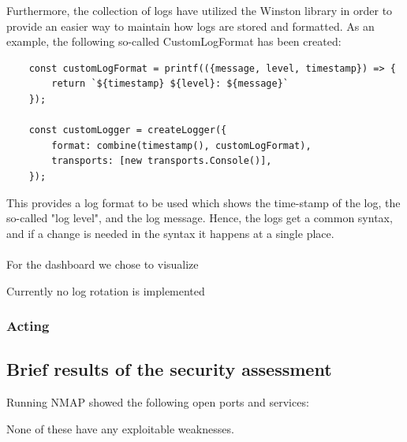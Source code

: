 Furthermore, the collection of logs have utilized the Winston library in order to provide an easier way to maintain how logs are stored and formatted.\cite{winston} As an example, the following so-called CustomLogFormat has been created:
\begin{verbatim}
    const customLogFormat = printf(({message, level, timestamp}) => {
        return `${timestamp} ${level}: ${message}`
    });
    
    const customLogger = createLogger({
        format: combine(timestamp(), customLogFormat),
        transports: [new transports.Console()],
    });
\end{verbatim}
This provides a log format to be used which shows the time-stamp of the log, the so-called "log level", and the log message. Hence, the logs get a common syntax, and if a change is needed in the syntax it happens at a single place.
\\\\
\noindent
For the dashboard we chose to visualize 

\noindent
Currently no log rotation is implemented

\subsubsection{Acting}

\subsection{Brief results of the security assessment}
Running NMAP showed the following open ports and services:

None of these have any exploitable weaknesses. 

